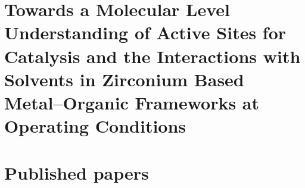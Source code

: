 \documentclass[10pt,twoside]{book}
\newcommand\oddpageleftmark{}
\newcommand\evenpagerightmark{}
\begin{document}
\renewcommand*{\thesection}{\thechapter.\arabic{section}}       %

\graphicspath{{figures/}}


\mainmatter     %
\renewcommand*{\thesection}{\thechapter.\arabic{section}}

\newcommand\fdtsvrightmarktmp{{\scshape\small Chapter }}
\renewcommand\evenpagerightmark{{\scshape\small\chaptername\ \thechapter}}
\renewcommand\oddpageleftmark{{\scshape\small\leftmark}}



\baselineskip 13.0pt

\part{Towards a Molecular Level Understanding of Active Sites for Catalysis and the Interactions with Solvents in Zirconium Based Metal--Organic Frameworks at Operating Conditions}
\graphicspath{{figures/}}





\part{Published papers}



\appendix


%



% 
\clearpage{\pagestyle{empty}\cleardoublepage}




\cleardoublepage

\end{document}
